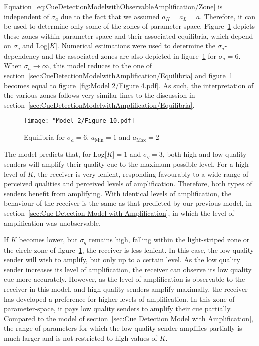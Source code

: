 \documentclass[a4paper,12pt]{article}
\numberwithin{equation}{section}
\begin{document}
Equation~\ref{eq:CueDetectionModelwithObservableAmplification/Zone} is independent of $\sigma_{a}$ due to the fact that we assumed \mbox{$a_{H}=a_{L}=a$}. Therefore, it can be used to determine only some of the zones of parameter-space. Figure~\ref{fig:Model 2/Figure 10.pdf} depicts these zones within parameter-space and their associated equilibria, which depend on $\sigma_{q}$ and Log[$K$]. Numerical estimations were used to determine the $\sigma_{a}$-dependency and the associated zones are also depicted in figure~\ref{fig:Model 2/Figure 10.pdf} for $\sigma_{a}=6$. When $\sigma_{a} \to \infty$, this model reduces to the one of section~\ref{sec:CueDetectionModelwithAmplification/Equilibria} and figure~\ref{fig:Model 2/Figure 10.pdf} becomes equal to figure~\ref{fig:Model 2/Figure 4.pdf}. As such, the interpretation of the various zones follows very similar lines to the discussion in section~\ref{sec:CueDetectionModelwithAmplification/Equilibria}.

\begin{figure}[!h]
\begin{center}
\leavevmode
\texttt{[image: "Model 2/Figure 10.pdf]}
\caption{Equilibria for $\sigma_{a}=6$, $a_{\text{Min}}=1$ and $a_{\text{Max}}=2$}
\label{fig:Model 2/Figure 10.pdf}
\end{center}
\end{figure}

The model predicts that, for Log[$K$]$=1$ and $\sigma_{q}=3$, both high and low quality senders will amplify their quality cue to the maximum possible level. For a high level of $K$, the receiver is very lenient, responding favourably to a wide range of perceived qualities and perceived levels of amplification. Therefore, both types of senders benefit from amplifying. With identical levels of amplification, the behaviour of the receiver is the same as that predicted by our previous model, in section~\ref{sec:Cue Detection Model with Amplification}, in which the level of amplification was unobservable.

If $K$ becomes lower, but $\sigma_{q}$ remains high, falling within the light-striped zone or the circle zone of figure~\ref{fig:Model 2/Figure 10.pdf}, the receiver is less lenient. In this case, the low quality sender will wish to amplify, but only up to a certain level. As the low quality sender increases its level of amplification, the receiver can observe its low quality cue more accurately. However, as the level of amplification is observable to the receiver in this model, and high quality senders amplify maximally, the receiver has developed a preference for higher levels of amplification. In this zone of parameter-space, it pays low quality senders to amplify their cue partially. Compared to the model of section~\ref{sec:Cue Detection Model with Amplification}, the range of parameters for which the low quality sender amplifies partially is much larger and is not restricted to high values of $K$.
\end{document}
